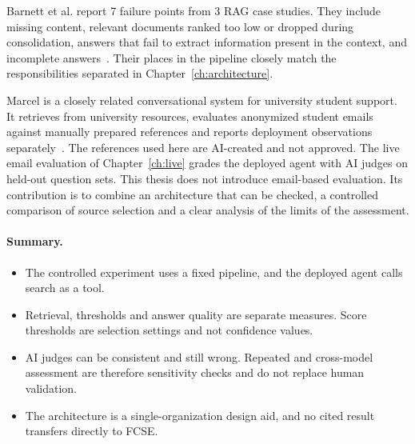 Barnett et al. report 7 failure points from 3 RAG case studies. They include missing content, relevant documents ranked too low or dropped during consolidation, answers that fail to extract information present in the context, and incomplete answers~\cite{barnett2024seven}. Their places in the pipeline closely match the responsibilities separated in Chapter~\ref{ch:architecture}.

Marcel is a closely related conversational system for university student support. It retrieves from university resources, evaluates anonymized student emails against manually prepared references and reports deployment observations separately~\cite{trienes2025marcel}. The references used here are AI-created and not approved. The live email evaluation of Chapter~\ref{ch:live} grades the deployed agent with AI judges on held-out question sets. This thesis does not introduce email-based evaluation. Its contribution is to combine an architecture that can be checked, a controlled comparison of source selection and a clear analysis of the limits of the assessment.

\paragraph{Summary.}
\begin{itemize}
  \item The controlled experiment uses a fixed pipeline, and the deployed agent calls search as a tool.
  \item Retrieval, thresholds and answer quality are separate measures. Score thresholds are selection settings and not confidence values.
  \item AI judges can be consistent and still wrong. Repeated and cross-model assessment are therefore sensitivity checks and do not replace human validation.
  \item The architecture is a single-organization design aid, and no cited result transfers directly to FCSE.
\end{itemize}
